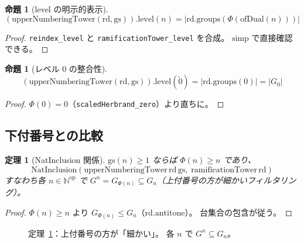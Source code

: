 \documentclass[a4paper,11pt]{ltjsarticle}
\theoremstyle{definition}
\theoremstyle{plain}
\newtheorem{theorem}[definition]{定理}
\newtheorem{proposition}[definition]{命題}
\theoremstyle{remark}
\newcommand{\Phi}{\varPhi}
\begin{document}
\begin{proposition}[level の明示的表示]\label{prop:upper-numbering-level}
  \[
    (\mathrm{upperNumberingTower}(\mathrm{rd},\mathrm{gs})).\mathrm{level}(n)
    = \lvert \mathrm{rd.groups}(\Phi(\mathrm{ofDual}(n)))\rvert
  \]
\end{proposition}

\begin{proof}
  \texttt{reindex\_level} と \texttt{ramificationTower\_level} を合成。
  $\mathrm{simp}$ で直接確認できる。
\end{proof}

\begin{proposition}[レベル 0 の整合性]\label{prop:upper-zero}
  \[
    (\mathrm{upperNumberingTower}(\mathrm{rd},\mathrm{gs})).\mathrm{level}(\tilde{0})
    = \lvert \mathrm{rd.groups}(0)\rvert = \lvert G_0\rvert
  \]
\end{proposition}

\begin{proof}
  $\Phi(0) = 0$（\texttt{scaledHerbrand\_zero}）より直ちに。
\end{proof}

\subsection{下付番号との比較}

\begin{theorem}[NatInclusion 関係]\label{thm:upper-nat-inclusion}
  $\mathrm{gs}(n) \geq 1$ ならば $\Phi(n) \geq n$ であり、
  \[
    \mathrm{NatInclusion}(\mathrm{upperNumberingTower}\,\mathrm{rd}\,\mathrm{gs},\;\mathrm{ramificationTower}\,\mathrm{rd})
  \]
  すなわち各 $n \in \mathbb{N}^{\mathrm{op}}$ で
  $G^n = G_{\Phi(n)} \subseteq G_n$（上付番号の方が細かいフィルタリング）。
\end{theorem}

\begin{proof}
  $\Phi(n) \geq n$ より $G_{\Phi(n)} \leq G_n$（$\mathrm{rd.antitone}$）。
  台集合の包含が従う。
\end{proof}

\begin{figure}[H]
\centering
{}
\caption{定理~\ref{thm:upper-nat-inclusion}：上付番号の方が「細かい」。
各 $n$ で $G^n \subseteq G_n$。}
\label{fig:upper-vs-lower}
\end{figure}
\end{document}
